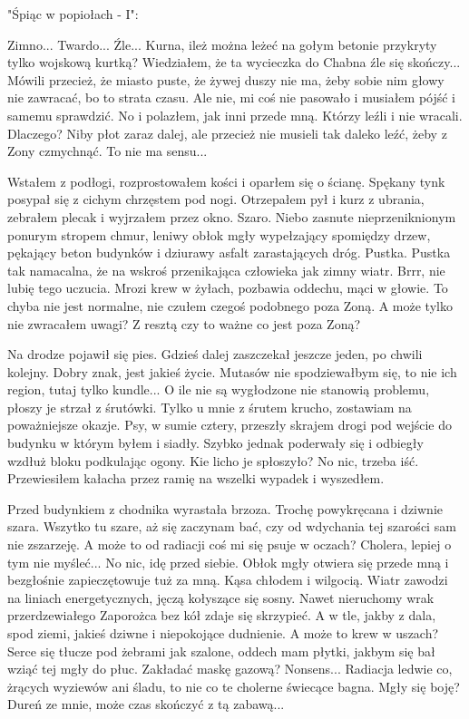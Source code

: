 \documentclass[../MAIN.tex]{subfiles}
\begin{document}
"Śpiąc w popiołach - I":  

Zimno... Twardo... Źle... Kurna, ileż można leżeć na gołym betonie przykryty tylko wojskową kurtką? Wiedziałem, że ta wycieczka do Chabna źle się skończy... Mówili przecież, że miasto puste, że żywej duszy nie ma, żeby sobie nim głowy nie zawracać, bo to strata czasu. Ale nie, mi coś nie pasowało i musiałem pójść i samemu sprawdzić. No i polazłem, jak inni przede mną. Którzy leźli i nie wracali. Dlaczego? Niby płot zaraz dalej, ale przecież nie musieli tak daleko leźć, żeby z Zony czmychnąć. To nie ma sensu...

Wstałem z podłogi, rozprostowałem kości i oparłem się o ścianę. Spękany tynk posypał się z cichym chrzęstem pod nogi. Otrzepałem pył i kurz z ubrania, zebrałem plecak i wyjrzałem przez okno. Szaro. Niebo zasnute nieprzeniknionym ponurym stropem chmur, leniwy obłok mgły wypełzający spomiędzy drzew, pękający beton budynków i dziurawy asfalt zarastających dróg. Pustka. Pustka tak namacalna, że na wskroś przenikająca człowieka jak zimny wiatr. Brrr, nie lubię tego uczucia. Mrozi krew w żyłach, pozbawia oddechu, mąci w głowie. To chyba nie jest normalne, nie czułem czegoś podobnego poza Zoną. A może tylko nie zwracałem uwagi? Z resztą czy to ważne co jest poza Zoną?

Na drodze pojawił się pies. Gdzieś dalej zaszczekał jeszcze jeden, po chwili kolejny. Dobry znak, jest jakieś życie. Mutasów nie spodziewałbym się, to nie ich region, tutaj tylko kundle... O ile nie są wygłodzone nie stanowią problemu, płoszy je strzał z śrutówki. Tylko u mnie z śrutem krucho, zostawiam na poważniejsze okazje. Psy, w sumie cztery, przeszły skrajem drogi pod wejście do budynku w którym byłem i siadły. Szybko jednak poderwały się i odbiegły wzdłuż bloku podkulając ogony. Kie licho je spłoszyło? No nic, trzeba iść. Przewiesiłem kałacha przez ramię na wszelki wypadek i wyszedłem.

Przed budynkiem z chodnika wyrastała brzoza. Trochę powykręcana i dziwnie szara. Wszytko tu szare, aż się zaczynam bać, czy od wdychania tej szarości sam nie zszarzeję. A może to od radiacji coś mi się psuje w oczach? Cholera, lepiej o tym nie myśleć... No nic, idę przed siebie. Obłok mgły otwiera się przede mną i bezgłośnie zapieczętowuje tuż za mną. Kąsa chłodem i wilgocią. Wiatr zawodzi na liniach energetycznych, jęczą kołyszące się sosny. Nawet nieruchomy wrak przerdzewiałego Zaporożca bez kół zdaje się skrzypieć. A w tle, jakby z dala, spod ziemi, jakieś dziwne i niepokojące dudnienie. A może to krew w uszach? Serce się tłucze pod żebrami jak szalone, oddech mam płytki, jakbym się bał wziąć tej mgły do płuc. Zakładać maskę gazową? Nonsens... Radiacja ledwie co, żrących wyziewów ani śladu, to nie co te cholerne świecące bagna. Mgły się boję? Dureń ze mnie, może czas skończyć z tą zabawą...
\end{document}
